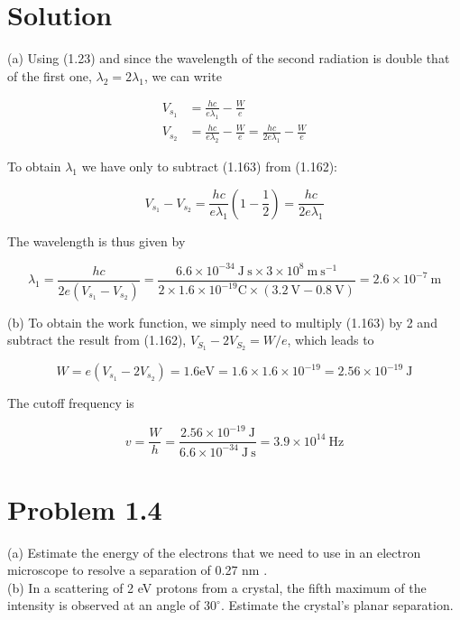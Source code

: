 \documentclass[10pt]{article}
\begin{document}
\section*{Solution}
(a) Using (1.23) and since the wavelength of the second radiation is double that of the first one, $\lambda_{2}=2 \lambda_{1}$, we can write


\begin{align*}
V_{s_{1}} & =\frac{h c}{e \lambda_{1}}-\frac{W}{e}  \tag{1.162}\\
V_{s_{2}} & =\frac{h c}{e \lambda_{2}}-\frac{W}{e}=\frac{h c}{2 e \lambda_{1}}-\frac{W}{e} \tag{1.163}
\end{align*}


To obtain $\lambda_{1}$ we have only to subtract (1.163) from (1.162):


\begin{equation*}
V_{s_{1}}-V_{s_{2}}=\frac{h c}{e \lambda_{1}}\left(1-\frac{1}{2}\right)=\frac{h c}{2 e \lambda_{1}} \tag{1.164}
\end{equation*}


The wavelength is thus given by


\begin{equation*}
\lambda_{1}=\frac{h c}{2 e\left(V_{s_{1}}-V_{s_{2}}\right)}=\frac{6.6 \times 10^{-34} \mathrm{~J} \mathrm{~s} \times 3 \times 10^{8} \mathrm{~m} \mathrm{~s}^{-1}}{2 \times 1.6 \times 10^{-19} \mathrm{C} \times(3.2 \mathrm{~V}-0.8 \mathrm{~V})}=2.6 \times 10^{-7} \mathrm{~m} \tag{1.165}
\end{equation*}


(b) To obtain the work function, we simply need to multiply (1.163) by 2 and subtract the result from (1.162), $V_{S_{1}}-2 V_{S_{2}}=W / e$, which leads to


\begin{equation*}
W=e\left(V_{s_{1}}-2 V_{s_{2}}\right)=1.6 \mathrm{eV}=1.6 \times 1.6 \times 10^{-19}=2.56 \times 10^{-19} \mathrm{~J} \tag{1.166}
\end{equation*}


The cutoff frequency is


\begin{equation*}
v=\frac{W}{h}=\frac{2.56 \times 10^{-19} \mathrm{~J}}{6.6 \times 10^{-34} \mathrm{~J} \mathrm{~s}}=3.9 \times 10^{14} \mathrm{~Hz} \tag{1.167}
\end{equation*}


\section*{Problem 1.4}
(a) Estimate the energy of the electrons that we need to use in an electron microscope to resolve a separation of 0.27 nm .\\
(b) In a scattering of 2 eV protons from a crystal, the fifth maximum of the intensity is observed at an angle of $30^{\circ}$. Estimate the crystal's planar separation.
\end{document}
